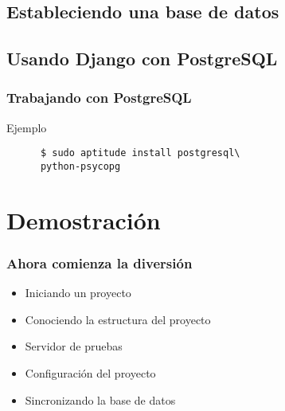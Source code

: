 \documentclass{beamer}
\newenvironment{ejemplo}{\begin{exampleblock}{Ejemplo}}{\end{exampleblock}}
\begin{document}
\subsection{Estableciendo una base de datos}

\subsection{Usando Django con PostgreSQL}
\begin{frame}[fragile]
  \frametitle{Trabajando con PostgreSQL}
  \begin{ejemplo}
    \begin{verbatim}
      $ sudo aptitude install postgresql\
      python-psycopg 
    \end{verbatim}
  \end{ejemplo}
\end{frame}

\section{Demostración}
\begin{frame}
  \frametitle{Ahora comienza la diversión}
  \begin{itemize}[<+->]
    \item
      Iniciando un proyecto
    \item
      Conociendo la estructura del proyecto
    \item
      Servidor de pruebas
    \item
      Configuración del proyecto
    \item
      Sincronizando la base de datos
  \end{itemize}
\end{frame}
\end{document}
